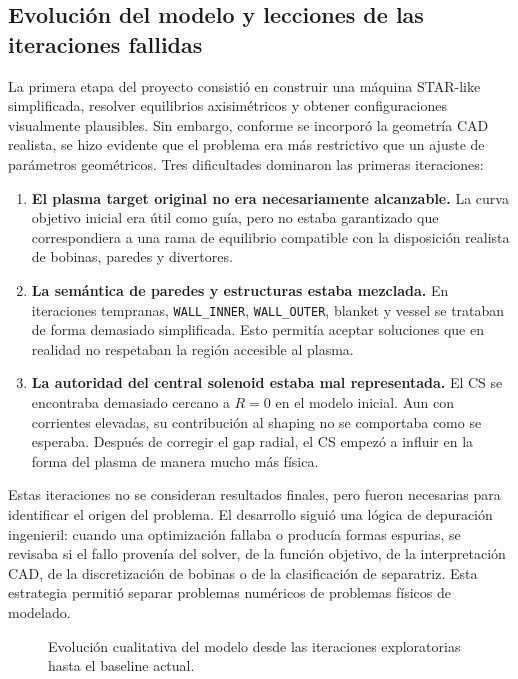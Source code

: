 \documentclass[11pt,a4paper]{article}
\begin{document}
\subsection{Evolución del modelo y lecciones de las iteraciones fallidas}
La primera etapa del proyecto consistió en construir una máquina STAR-like simplificada,
resolver equilibrios axisimétricos y obtener configuraciones visualmente plausibles. Sin embargo,
conforme se incorporó la geometría CAD realista, se hizo evidente que el problema era más
restrictivo que un ajuste de parámetros geométricos. Tres dificultades dominaron las primeras
iteraciones:

\begin{enumerate}
    \item \textbf{El plasma target original no era necesariamente alcanzable.} La curva objetivo
    inicial era útil como guía, pero no estaba garantizado que correspondiera a una rama de
    equilibrio compatible con la disposición realista de bobinas, paredes y divertores.

    \item \textbf{La semántica de paredes y estructuras estaba mezclada.} En iteraciones tempranas,
    \texttt{WALL\_INNER}, \texttt{WALL\_OUTER}, blanket y vessel se trataban de forma demasiado
    simplificada. Esto permitía aceptar soluciones que en realidad no respetaban la región
    accesible al plasma.

    \item \textbf{La autoridad del central solenoid estaba mal representada.} El CS se encontraba
    demasiado cercano a $R=0$ en el modelo inicial. Aun con corrientes elevadas, su contribución
    al shaping no se comportaba como se esperaba. Después de corregir el gap radial, el CS empezó
    a influir en la forma del plasma de manera mucho más física.
\end{enumerate}

Estas iteraciones no se consideran resultados finales, pero fueron necesarias para identificar
el origen del problema. El desarrollo siguió una lógica de depuración ingenieril: cuando una
optimización fallaba o producía formas espurias, se revisaba si el fallo provenía del solver,
de la función objetivo, de la interpretación CAD, de la discretización de bobinas o de la
clasificación de separatriz. Esta estrategia permitió separar problemas numéricos de problemas
físicos de modelado.

\begin{figure}[htbp]
\centering
{}
\caption{Evolución cualitativa del modelo desde las iteraciones exploratorias hasta el baseline actual.}
\label{fig:star_model_evolution_placeholder}
\end{figure}
\end{document}
